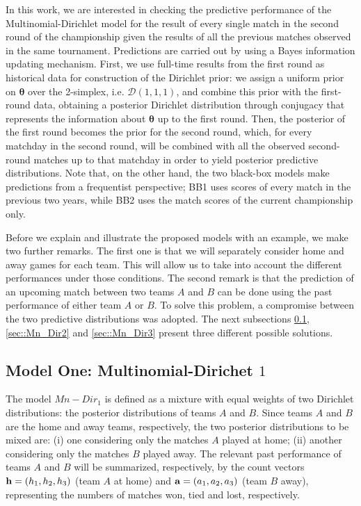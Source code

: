 \documentclass[journal,article,accept,moreauthors,pdftex,12pt,a4paper]{mdpi}
\begin{document}
        In this work, we are interested in checking the predictive performance of the Multinomial-Dirichlet
        model for the result of every single match in the second round of the championship given the results
        of all the previous matches observed in the same tournament. Predictions
        are carried out by using a Bayes information updating mechanism. First, we use full-time
        results from the first round as historical data for construction of the Dirichlet prior: we assign a uniform prior on
        $\boldsymbol{\theta}$ over the 2-simplex, i.e. $\mathcal{D}(1, 1, 1)$, and combine this prior with
        the first-round data, obtaining a posterior Dirichlet distribution through conjugacy that represents
        the information about $\boldsymbol{\theta}$ up to the first round. Then, the posterior of the first
        round becomes the prior for the second round, which, for every matchday in the second round, will be combined with all the observed second-round matches
        up to that matchday in order to yield posterior predictive distributions. Note that, on the other hand, the two
        black-box models make predictions from a frequentist perspective; BB1 uses scores of every match
        in the previous two years, while BB2 uses the match scores of the current championship only.

        Before we explain and illustrate the proposed models with an example, we make two further remarks.
        The first one is that we will separately consider home and away games for each team. This will allow us to take into account the different performances under those conditions.
        The second remark is that the prediction of an upcoming match between two teams $A$ and $B$ can be done using
        the past performance of either team $A$ or $B$.
        To solve this problem, a compromise between the two predictive distributions was adopted.
        The next subsections \ref{sec::Mn_Dir1}, \ref{sec::Mn_Dir2} and \ref{sec::Mn_Dir3} present three different possible solutions.

    \subsection{Model One: Multinomial-Dirichet $1$}
    \label{sec::Mn_Dir1}

    The model $Mn-Dir_1$ is defined as a mixture with equal weights of two Dirichlet distributions: the posterior distributions of teams $A$ and $B$.
    Since teams $A$ and $B$ are the home and away teams, respectively, the two posterior distributions to be mixed are: (i) one considering only the matches $A$ played at home; (ii) another considering only the matches $B$ played away.
    The relevant past performance of teams $A$ and $B$ will be summarized, respectively, by the count vectors ${\bf h} = (h_1, h_2, h_3)$ (team $A$ at home) and ${\bf a} = (a_1, a_2, a_3)$ (team $B$ away), representing the numbers of matches won, tied and lost, respectively.
\end{document}
